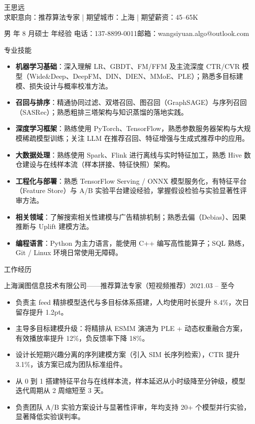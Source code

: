 \documentclass[10.5pt,fontset=windows]{ctexart}
\newcommand{\rsection}[1]{%
  \Needspace*{6\baselineskip}%
  \vspace{9pt}%
  {\color{maincolor}\heiti\zihao{4}#1}\par
  \vspace{1pt}{\color{maincolor}\rule{\textwidth}{1pt}}\par
  \vspace{3pt}}
\newcommand{\entryhead}[2]{%
  \Needspace*{3\baselineskip}%
  {\heiti #1}\hfill{\color{graytext}\small #2}\par\vspace{1pt}}
\begin{document}
\begin{center}
  {\heiti 王思远}\\[4pt]
  {求职意向：推荐算法专家}\quad
  {\color{graytext}|}\quad
  {期望城市：上海}\quad
  {\color{graytext}|}\quad
  {期望薪资：45--65K}
\end{center}
\vspace{2pt}
\begin{center}
  男 年 8 月\quad 硕士 年经验\quad
  电话：137-8899-0011\quad 邮箱：wangsiyuan.algo@outlook.com
\end{center}

\rsection{专业技能}
\begin{itemize}
  \item \textbf{机器学习基础}：深入理解 LR、GBDT、FM/FFM 及主流深度 CTR/CVR 模型（Wide\&Deep、DeepFM、DIN、DIEN、MMoE、PLE）；熟悉多目标建模、损失设计与概率校准方法。
  \item \textbf{召回与排序}：精通协同过滤、双塔召回、图召回（GraphSAGE）与序列召回（SASRec）；熟悉粗排三塔架构与知识蒸馏的落地实践。
  \item \textbf{深度学习框架}：熟练使用 PyTorch、TensorFlow，熟悉参数服务器架构与大规模稀疏模型训练；关注 LLM 在推荐召回、特征增强与生成式推荐中的应用。
  \item \textbf{大数据处理}：熟练使用 Spark、Flink 进行离线与实时特征加工，熟悉 Hive 数仓建设与在线样本流（样本拼接、特征快照）架构。
  \item \textbf{工程化与部署}：熟悉 TensorFlow Serving / ONNX 模型服务化，有特征平台（Feature Store）与 A/B 实验平台建设经验，掌握假设检验与实验显著性评审方法。
  \item \textbf{相关领域}：了解搜索相关性建模与广告精排机制；熟悉去偏（Debias）、因果推断与 Uplift 建模方法。
  \item \textbf{编程语言}：Python 为主力语言，能使用 C++ 编写高性能算子；SQL 熟练，Git / Linux 环境日常使用无障碍。
\end{itemize}

\rsection{工作经历}

\entryhead{上海澜图信息技术有限公司\quad ——\quad 推荐算法专家（短视频推荐）}{2021.03 -- 至今}
\begin{itemize}
  \item 负责主 feed 精排模型迭代与多目标体系搭建，人均使用时长提升 8.4\%，次日留存提升 1.2pt。
  \item 主导多目标建模升级：将精排从 ESMM 演进为 PLE + 动态权重融合方案，有效播放率提升 12\%，负反馈率下降 18\%。
  \item 设计长短期兴趣分离的序列建模方案（引入 SIM 长序列检索），CTR 提升 3.1\%，该方案已成为团队标准组件。
  \item 从 0 到 1 搭建特征平台与在线样本流，样本延迟从小时级降至分钟级，模型迭代周期从 2 周缩短至 3 天。
  \item 负责团队 A/B 实验方案设计与显著性评审，年均支持 20+ 个模型并行实验，显著降低实验误判率。
\end{itemize}
\end{document}

